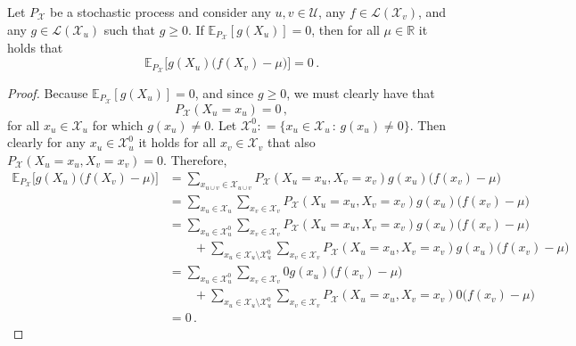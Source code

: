 \documentclass[twoside,11pt]{article}
\newcommand{\reals}{\mathbb{R}}
\newcommand{\states}{\mathcal{X}}
\newcommand{\gambles}{\mathcal{L}}
\newcommand{\coloneqq}{:\!=}
\begin{document}
\begin{lemma}\label{lemma:conditioning_zero_means_bayes_zero}
Let $P_\states$ be a stochastic process and consider any $u,v\in\mathcal{U}$, any $f\in\gambles(\states_v)$, and any $g\in\gambles(\states_u)$ such that $g\geq 0$. If $\mathbb{E}_{P_\states}[g(X_u)]=0$, then for all $\mu\in\reals$ it holds that
\begin{equation*}
\mathbb{E}_{P_\states}\bigl[g(X_u)\bigl(f(X_v) - \mu\bigr)\bigr]=0\,.
\end{equation*}
\end{lemma}
\begin{proof}
Because $\mathbb{E}_{P_\states}[g(X_u)]=0$, and since $g\geq 0$, we must clearly have that
\begin{equation*}
P_\states(X_u=x_u) = 0\,,
\end{equation*}
for all $x_u\in\states_u$ for which $g(x_u)\neq 0$. Let $\states_u^0\coloneqq\{x_u\in\states_u\,:\,g(x_u)\neq 0\}$. Then clearly for any $x_u\in\states_u^0$ it holds for all $x_v\in\states_v$ that also $P_\states(X_u=x_u,X_v=x_v)=0$. Therefore,
\begin{align*}
\mathbb{E}_{P_\states}\bigl[g(X_u)\bigl(f(X_v) - \mu\bigr)\bigr] &= \sum_{x_{u\cup v}\in\states_{u\cup v}} P_\states(X_u=x_u,X_v=x_v)g(x_u)\bigl(f(x_v) - \mu\bigr) \\
 &= \sum_{x_{u}\in\states_{u}}\sum_{x_v\in\states_v} P_\states(X_u=x_u,X_v=x_v)g(x_u)\bigl(f(x_v) - \mu\bigr) \\
 &= \sum_{x_{u}\in\states_u^0}\sum_{x_v\in\states_v} P_\states(X_u=x_u,X_v=x_v)g(x_u)\bigl(f(x_v) - \mu\bigr) \\
 &\quad\quad + \sum_{x_{u}\in\states_{u}\setminus \states_u^0}\sum_{x_v\in\states_v} P_\states(X_u=x_u,X_v=x_v)g(x_u)\bigl(f(x_v) - \mu\bigr) \\
 &= \sum_{x_{u}\in\states_u^0}\sum_{x_v\in\states_v} 0g(x_u)\bigl(f(x_v) - \mu\bigr) \\
 &\quad\quad + \sum_{x_{u}\in\states_{u}\setminus \states_u^0}\sum_{x_v\in\states_v} P_\states(X_u=x_u,X_v=x_v)0\bigl(f(x_v) - \mu\bigr) \\
 &= 0\,.
\end{align*}
\end{proof}
\end{document}
